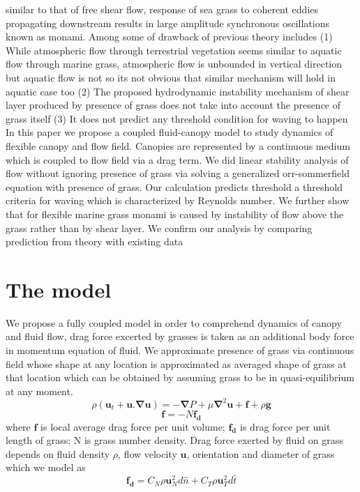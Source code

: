 \documentclass[aps,preprint,floatfix,prl]{revtex4-1}
\newcommand{\bu}{\mathbf{u}}
\newcommand{\grad}{\mathbf{\nabla}}
\begin{document}
similar to that of free shear flow, response of sea grass to coherent eddies propagating downstream results in large amplitude synchronous oscillations known as monami. 
Among some of drawback of previous theory includes
(1) While atmospheric flow through terrestrial vegetation seems similar to aquatic flow through marine grass, atmospheric flow is unbounded in vertical direction 
but aquatic flow is not so its not obvious that similar mechanism will hold in aquatic case too (2) The proposed hydrodynamic instability mechanism of shear layer produced 
by presence of grass does not take into account the presence of grass itself (3) It does not predict any threshold condition for waving to happen 
\newline     
In this paper we propose a coupled fluid-canopy model to study dynamics of flexible canopy and flow field. Canopies are represented by a continuous 
medium which is coupled to flow field via a drag term. We did linear stability analysis of flow without ignoring presence of grass via solving 
a generalized orr-sommerfield equation with presence of grass. Our calculation predicts threshold a threshold criteria for waving which is characterized by Reynolds number.
We further show that for flexible marine grass monami is caused by instability of flow above the grass rather than by shear layer. We confirm our analysis by comparing 
prediction from theory with existing data

\section{The model}
We propose a fully coupled model in order to comprehend dynamics of canopy and fluid flow, drag force excerted by grasses is
taken as an additional body force in momentum equation of fluid. We approximate presence of grass via continuous field whose shape at any location is approximated as averaged 
shape of grass at that location which can be obtained by assuming grass to be in quasi-equilibrium at any moment.
\begin{equation}
\rho \left(\bu_{t}+\bu.\grad\bu \right) = -\grad P+\mu\grad^{2}\bu +\mathbf{f}+\rho\mathbf{g}
\end{equation}
\begin{equation}
 \mathbf{f}=-N\mathbf{f_{d}}
\end{equation}
where $\mathbf{f}$ is local average drag force per unit volume; $\mathbf{f_{d}}$ is drag force per unit length of grass; N is grass number density. 
Drag force exerted by fluid on grass depends on fluid density $\rho$, flow velocity $\bu$, orientation and diameter of grass which we model as 
\begin{equation}
 \mathbf{f_{d}}=C_{N}\rho\bu_{N}^{2}d\hat{n}+C_{T}\rho\bu_{T}^{2}d\hat{t}
\end{equation}
\end{document}
